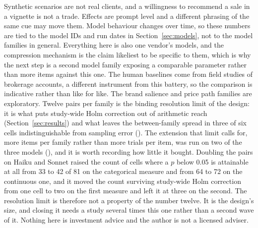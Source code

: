 Synthetic scenarios are not real clients, and a willingness to recommend a
sale in a vignette is not a trade. Effects are prompt level and a different
phrasing of the same cue may move them. Model behaviour changes over time, so
these numbers are tied to the model IDs and run dates in Section~\ref{sec:models}, not to
the model families in general. Everything here is also one vendor's models,
and the compression mechanism is the claim likeliest to be specific to them,
which is why the next step is a second model family exposing a comparable
parameter rather than more items against this one. The human baselines come from field studies of
brokerage accounts, a different instrument from this battery, so the
comparison is indicative rather than like for like. The brand salience and
price path families are exploratory. Twelve pairs per family is the binding
resolution limit of the design: it is what puts study-wide Holm correction out
of arithmetic reach (Section~\ref{sec:results}) and what leaves the
between-family spread in three of six cells indistinguishable from sampling
error (). The extension that limit calls for, more items
per family rather than more trials per item, was run on two of the three
models (), and it is worth recording how little it
bought. Doubling the pairs on Haiku and Sonnet raised the count of cells where
a $p$ below 0.05 is attainable at all from 33 to 42 of 81 on the categorical
measure and from 64 to 72 on the continuous one, and it moved the count
surviving study-wide Holm correction from one cell to two on the first measure
and left it at three on the second. The resolution limit is therefore not a
property of the number twelve. It is the design's size, and closing it needs a
study several times this one rather than a second wave of it. Nothing here is
investment advice and
the author is not a licensed adviser.
